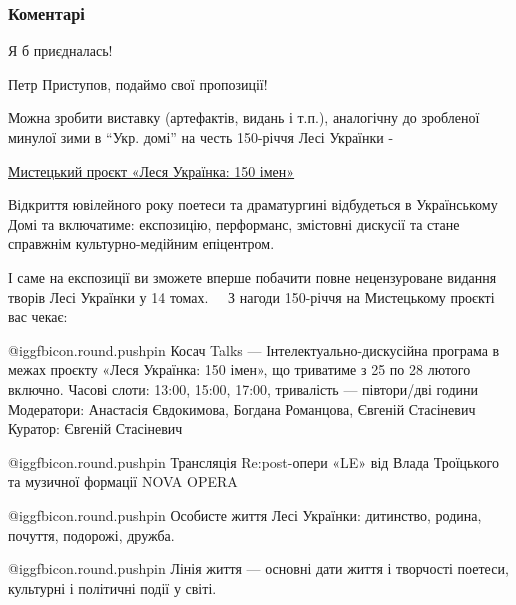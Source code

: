  
 
 
 
 
\subsubsection{Коментарі}
\label{sec:03_12_2021.fb.tolkachev_aleksej.1.299_rokiv_skovoroda.cmt}

\begin{itemize} %
Я б приєдналась!

Петр Приступов, подаймо свої пропозиції!


Можна зробити виставку (артефактів, видань і т.п.), аналогічну до зробленої
минулої зими в \enquote{Укр. домі} на честь 150-річчя Лесі Українки - 

\href{https://www.facebook.com/events/779040659377151/}{%
Мистецький проєкт «Леся Українка: 150 імен»%
}

\begin{multicols}{2}

Відкриття ювілейного року поетеси та драматургині відбудеться в Українському
Домі та включатиме: експозицію, перформанс, змістовні дискусії та стане
справжнім культурно-медійним епіцентром.  ⠀

І саме на експозиції ви зможете вперше побачити повне нецензуроване видання
творів Лесі Українки у 14 томах.
⠀
З нагоди 150-річчя на Мистецькому проєкті вас чекає:

@igg{fbicon.round.pushpin}  Косач Talks — Інтелектуально-дискусійна програма в
межах проєкту «Леся Українка: 150 імен», що триватиме з 25 по 28 лютого
включно.  Часові слоти: 13:00, 15:00, 17:00, тривалість — півтори/дві години
Модератори: Анастасія Євдокимова, Богдана Романцова, Євгеній Стасіневич
Куратор: Євгеній Стасіневич

@igg{fbicon.round.pushpin}  Трансляція Re:post-опери «LE» від Влада Троїцького та музичної формації NOVA OPERA

@igg{fbicon.round.pushpin}  Особисте життя Лесі Українки: дитинство, родина, почуття, подорожі, дружба.

@igg{fbicon.round.pushpin}  Лінія життя — основні дати життя і творчості поетеси, культурні і політичні події у світі.


\end{multicols}
\end{itemize}
